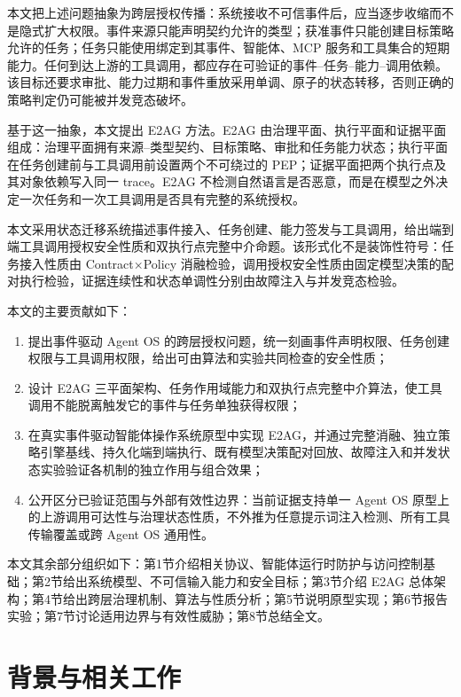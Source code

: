 本文把上述问题抽象为跨层授权传播：系统接收不可信事件后，应当逐步收缩而不是隐式扩大权限。事件来源只能声明契约允许的类型；获准事件只能创建目标策略允许的任务；任务只能使用绑定到其事件、智能体、MCP 服务和工具集合的短期能力。任何到达上游的工具调用，都应存在可验证的事件--任务--能力--调用依赖。该目标还要求审批、能力过期和事件重放采用单调、原子的状态转移，否则正确的策略判定仍可能被并发竞态破坏。

基于这一抽象，本文提出 E2AG 方法。E2AG 由治理平面、执行平面和证据平面组成：治理平面拥有来源--类型契约、目标策略、审批和任务能力状态；执行平面在任务创建前与工具调用前设置两个不可绕过的 PEP；证据平面把两个执行点及其对象依赖写入同一 trace。E2AG 不检测自然语言是否恶意，而是在模型之外决定一次任务和一次工具调用是否具有完整的系统授权。

本文采用状态迁移系统描述事件接入、任务创建、能力签发与工具调用，给出端到端工具调用授权安全性质和双执行点完整中介命题。该形式化不是装饰性符号：任务接入性质由 Contract$\times$Policy 消融检验，调用授权安全性质由固定模型决策的配对执行检验，证据连续性和状态单调性分别由故障注入与并发竞态检验。

本文的主要贡献如下：
\begin{enumerate}
  \item 提出事件驱动 Agent OS 的跨层授权问题，统一刻画事件声明权限、任务创建权限与工具调用权限，给出可由算法和实验共同检查的安全性质；
  \item 设计 E2AG 三平面架构、任务作用域能力和双执行点完整中介算法，使工具调用不能脱离触发它的事件与任务单独获得权限；
  \item 在真实事件驱动智能体操作系统原型中实现 E2AG，并通过完整消融、独立策略引擎基线、持久化端到端执行、既有模型决策配对回放、故障注入和并发状态实验验证各机制的独立作用与组合效果；
  \item 公开区分已验证范围与外部有效性边界：当前证据支持单一 Agent OS 原型上的上游调用可达性与治理状态性质，不外推为任意提示词注入检测、所有工具传输覆盖或跨 Agent OS 通用性。
\end{enumerate}

本文其余部分组织如下：第1节介绍相关协议、智能体运行时防护与访问控制基础；第2节给出系统模型、不可信输入能力和安全目标；第3节介绍 E2AG 总体架构；第4节给出跨层治理机制、算法与性质分析；第5节说明原型实现；第6节报告实验；第7节讨论适用边界与有效性威胁；第8节总结全文。

\section{背景与相关工作}\label{sec:related-v11}

